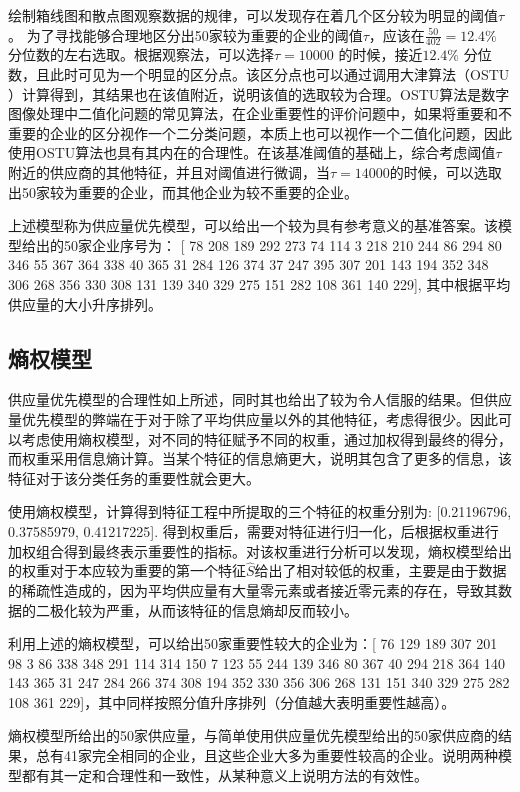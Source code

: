 \documentclass{my_paper}
\begin{document}
绘制箱线图和散点图观察数据的规律，可以发现存在着几个区分较为明显的阈值$\tau$。 为了寻找能够合理地区分出50家较为重要的企业的阈值$\tau$，应该在$\frac{50}{402} = 12.4 \%$ 分位数的左右选取。根据观察法，可以选择$\tau =10000$ 的时候，接近$12.4 \% $ 分位数，且此时可见为一个明显的区分点。该区分点也可以通过调用大津算法（OSTU \cite{gonzale2002digital}）计算得到，其结果也在该值附近，说明该值的选取较为合理。OSTU算法是数字图像处理中二值化问题的常见算法，在企业重要性的评价问题中，如果将重要和不重要的企业的区分视作一个二分类问题，本质上也可以视作一个二值化问题，因此使用OSTU算法也具有其内在的合理性。在该基准阈值的基础上，综合考虑阈值$\tau$附近的供应商的其他特征，并且对阈值进行微调，当$\tau=14000$的时候，可以选取出50家较为重要的企业，而其他企业为较不重要的企业。

上述模型称为供应量优先模型，可以给出一个较为具有参考意义的基准答案。该模型给出的50家企业序号为： [ 78 208 189 292 273  74 114  3 218 210 244  86 294  80 346  55 367 364 338  40 365  31 284 126 374  37 247 395 307 201 143 194 352 348 306 268 356 330 308 131 139 340 329 275 151 282 108 361 140 229], 其中根据平均供应量的大小升序排列。

\subsection{熵权模型}

供应量优先模型的合理性如上所述，同时其也给出了较为令人信服的结果。但供应量优先模型的弊端在于对于除了平均供应量以外的其他特征，考虑得很少。因此可以考虑使用熵权模型，对不同的特征赋予不同的权重，通过加权得到最终的得分，而权重采用信息熵计算。当某个特征的信息熵更大，说明其包含了更多的信息，该特征对于该分类任务的重要性就会更大。

使用熵权模型，计算得到特征工程中所提取的三个特征的权重分别为: [0.21196796, 0.37585979, 0.41217225]. 得到权重后，需要对特征进行归一化，后根据权重进行加权组合得到最终表示重要性的指标。对该权重进行分析可以发现，熵权模型给出的权重对于本应较为重要的第一个特征$\hat{S}$给出了相对较低的权重，主要是由于数据的稀疏性造成的，因为平均供应量有大量零元素或者接近零元素的存在，导致其数据的二极化较为严重，从而该特征的信息熵却反而较小。

利用上述的熵权模型，可以给出50家重要性较大的企业为：[ 76 129 189 307 201  98   3  86 338 348 291 114 314 150   7 123  55 244 139 346  80 367  40 294 218 364 140 143 365  31 247 284 266 374 308 194 352 330 356 306 268 131 151 340 329 275 282 108 361 229]，其中同样按照分值升序排列（分值越大表明重要性越高）。

熵权模型所给出的50家供应量，与简单使用供应量优先模型给出的50家供应商的结果，总有41家完全相同的企业，且这些企业大多为重要性较高的企业。说明两种模型都有其一定和合理性和一致性，从某种意义上说明方法的有效性。
\end{document}

